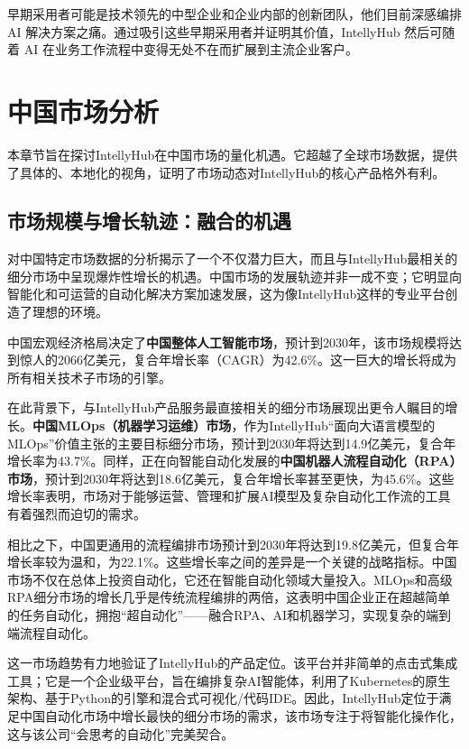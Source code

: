 \documentclass[11点, A4纸, 单面]{article}
\begin{document}
早期采用者可能是技术领先的中型企业和企业内部的创新团队，他们目前深感编排 AI 解决方案之痛。通过吸引这些早期采用者并证明其价值，IntellyHub 然后可随着 AI 在业务工作流程中变得无处不在而扩展到主流企业客户。
\section{中国市场分析}
本章节旨在探讨IntellyHub在中国市场的量化机遇。它超越了全球市场数据，提供了具体的、本地化的视角，证明了市场动态对IntellyHub的核心产品格外有利。

\subsection{市场规模与增长轨迹：融合的机遇}
对中国特定市场数据的分析揭示了一个不仅潜力巨大，而且与IntellyHub最相关的细分市场中呈现爆炸性增长的机遇。中国市场的发展轨迹并非一成不变；它明显向智能化和可运营的自动化解决方案加速发展，这为像IntellyHub这样的专业平台创造了理想的环境。

中国宏观经济格局决定了\textbf{中国整体人工智能市场}，预计到2030年，该市场规模将达到惊人的2066亿美元，复合年增长率（CAGR）为42.6\%\cite{ChinaAIMarket}。这一巨大的增长将成为所有相关技术子市场的引擎。

在此背景下，与IntellyHub产品服务最直接相关的细分市场展现出更令人瞩目的增长。\textbf{中国MLOps（机器学习运维）市场}，作为IntellyHub“面向大语言模型的MLOps”价值主张的主要目标细分市场\cite{IntellyHubBP}，预计到2030年将达到14.9亿美元，复合年增长率为43.7\%\cite{ChinaMLOpsMarket}。同样，正在向智能自动化发展的\textbf{中国机器人流程自动化（RPA）市场}，预计到2030年将达到18.6亿美元，复合年增长率甚至更快，为45.6\%\cite{ChinaRPAMarket}。这些增长率表明，市场对于能够运营、管理和扩展AI模型及复杂自动化工作流的工具有着强烈而迫切的需求。

相比之下，中国更通用的流程编排市场预计到2030年将达到19.8亿美元，但复合年增长率较为温和，为22.1\%\cite{ChinaProcessOrchMarket}。这些增长率之间的差异是一个关键的战略指标。中国市场不仅在总体上投资自动化，它还在智能自动化领域大量投入。MLOps和高级RPA细分市场的增长几乎是传统流程编排的两倍，这表明中国企业正在超越简单的任务自动化，拥抱“超自动化”——融合RPA、AI和机器学习，实现复杂的端到端流程自动化\cite{HyperAutomationShift, HyperAutomationTrends}。

这一市场趋势有力地验证了IntellyHub的产品定位。该平台并非简单的点击式集成工具；它是一个企业级平台，旨在编排复杂AI智能体，利用了Kubernetes的原生架构、基于Python的引擎和混合式可视化/代码IDE\cite{IntellyHubBP}。因此，IntellyHub定位于满足中国自动化市场中增长最快的细分市场的需求，该市场专注于将智能化操作化，这与该公司“会思考的自动化”完美契合。
\end{document}
